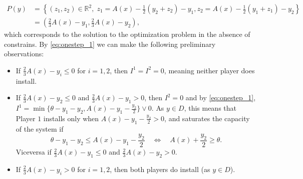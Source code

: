 \documentclass[10pt]{article}
\numberwithin{equation}{section}
\theoremstyle{plain}
\numberwithin{theorem}{section}
\theoremstyle{definition}
\def \R {\mathbb{R}}
\newcommand{\<}{\langle}
\renewcommand{\>}{\rangle}
\renewcommand{\(}{\left(}
\renewcommand{\)}{\right)}
\def \R  {{\mathbb {R}}}
\def \R {{\mathbb {R}}}
\begin{document}
{{\begin{align}
P(y)&={\left\{(z_1,z_2)\in \R^2, \; z_1=A(x)-\frac{1}{2}(y_2+z_2)-y_1, z_2=A(x)-\frac{1}{2}(y_1+z_1)-y_2 \right\} }\\
&=\left(\frac{2}{3}A(x)-y_1,\frac{2}{3}A(x)-y_2 \right), \label{eq:onestep_2}
\end{align}
which corresponds to the solution to the optimization problem in the absence of constrains. 
By \eqref{eq:onestep_1} we can make the following preliminary observations: 
\begin{itemize}
\item[-] If $\frac{2}{3}A(x)-y_i\le 0$ {for $i=1,2$, then $I^1=I^2=0$, meaning neither player does install}.
\item[-] If $\frac{2}{3}A(x)-y_2\le 0$ and $\frac{2}{3}A(x)-y_1> 0$, then {$I^2=0$ and} by \eqref{eq:onestep_1}, $I^1=\min \{\theta-y_1-y_2,A(x)-y_1-\frac{y_2}{2}\}\vee 0$. 
{As $y\in D$,} this means that {Player $1$} installs {only} when $A(x)-y_1-\frac{y_2}{2}> 0$, and saturates the capacity of the system if 
$${\theta-y_1-y_2\le A(x)-y_1-\frac{y_2}{2}\quad \Longleftrightarrow \quad A(x)+\frac{y_2}{2}\ge \theta}.$$
{Viceversa if $\frac{2}{3}A(x)-y_1\le 0$ and $\frac{2}{3}A(x)-y_2> 0$.} 
\item[-] If $\frac{2}{3}A(x)-y_i >  0$ {for $i=1,2$, then both players do install (as $y\in D$)}. %
\end{itemize}
%

}}
\end{document}
